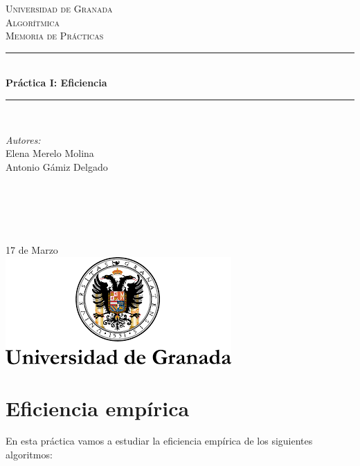 \documentclass[11pt]{article}
\begin{document}
\begin{titlepage}
\newcommand{\HRule}{\rule{\linewidth}{0.5mm}}
\center
\textsc{\LARGE Universidad de Granada}\\[1.5cm] %
\textsc{\Large Algorítmica}\\[0.5cm] %
\textsc{\large Memoria de Prácticas}\\[0.5cm] %
\HRule \\[0.4cm]
{ \huge \bfseries Práctica I: Eficiencia}\\[0.4cm] %
\HRule \\[1.5cm]
\begin{minipage}{0.4\textwidth}
\begin{flushleft} \large
\emph{Autores:}\\
Elena Merelo Molina \\ Antonio Gámiz Delgado\textsc{} %
\end{flushleft}
\end{minipage}
~
\begin{minipage}{0.4\textwidth}
\begin{flushright} \large
\emph{} \\
\textsc{} %
\end{flushright}
\end{minipage}\\[2cm]
{\large 17 de Marzo}\\[2cm] %
\includegraphics{logo.png}\\[1cm]
\vfill %
\end{titlepage}



\section{Eficiencia empírica}

En esta práctica vamos a estudiar la eficiencia empírica de los siguientes algoritmos:
\end{document}
